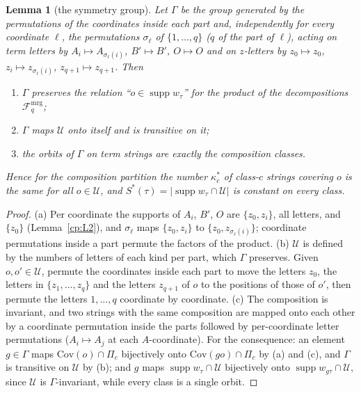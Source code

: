 \documentclass[11pt]{article}
\newtheorem{lemma}[theorem]{Lemma}
\theoremstyle{definition}
\theoremstyle{remark}
\newcommand{\abs}[1]{\lvert #1\rvert}
\DeclareMathOperator{\supp}{supp}
\newcommand{\Cov}{\mathrm{Cov}}               %
\newcommand{\Ukept}{\mathcal{U}}              %
\newcommand{\Fmrg}{\mathcal{F}^{\mathrm{mrg}}_q} %
\newcommand{\Bp}{B'}                          %
\newcommand{\Oterm}{O}                        %
\begin{document}
\begin{lemma}[the symmetry group]\label{cp:L6:lemmaC}
Let $\Gamma$ be the group generated by the permutations of the coordinates inside each part and, independently for every coordinate $\ell$, the permutations $\sigma_\ell$ of $\{1,\dots,q\}$ ($q$ of the part of $\ell$), acting on term letters by $A_i\mapsto A_{\sigma_\ell(i)}$, $\Bp\mapsto\Bp$, $\Oterm\mapsto\Oterm$ and on $z$-letters by $z_0\mapsto z_0$, $z_i\mapsto z_{\sigma_\ell(i)}$, $z_{q+1}\mapsto z_{q+1}$. Then
\begin{enumerate}[label=(\alph*)]
\item $\Gamma$ preserves the relation ``$o\in\supp w_\tau$'' for the product of the decompositions $\Fmrg$;
\item $\Gamma$ maps $\Ukept$ onto itself and is transitive on it;
\item the orbits of $\Gamma$ on term strings are exactly the composition classes.
\end{enumerate}
Hence for the composition partition the number $\kappa^*_c$ of class-$c$ strings covering $o$ is the same for all $o\in\Ukept$, and $S^*(\tau)=\abs{\supp w_\tau\cap\Ukept}$ is constant on every class.
\end{lemma}

\begin{proof}
(a) Per coordinate the supports of $A_i$, $\Bp$, $\Oterm$ are $\{z_0,z_i\}$, all letters, and $\{z_0\}$ (Lemma~\ref{cp:L2}), and $\sigma_\ell$ maps $\{z_0,z_i\}$ to $\{z_0,z_{\sigma_\ell(i)}\}$; coordinate permutations inside a part permute the factors of the product. (b) $\Ukept$ is defined by the numbers of letters of each kind per part, which $\Gamma$ preserves. Given $o,o'\in\Ukept$, permute the coordinates inside each part to move the letters $z_0$, the letters in $\{z_1,\dots,z_q\}$ and the letters $z_{q+1}$ of $o$ to the positions of those of $o'$, then permute the letters $1,\dots,q$ coordinate by coordinate. (c) The composition is invariant, and two strings with the same composition are mapped onto each other by a coordinate permutation inside the parts followed by per-coordinate letter permutations ($A_i\mapsto A_j$ at each $A$-coordinate).
For the consequence: an element $g\in\Gamma$ maps $\Cov(o)\cap\Pi_c$ bijectively onto $\Cov(go)\cap\Pi_c$ by (a) and (c), and $\Gamma$ is transitive on $\Ukept$ by (b); and $g$ maps $\supp w_\tau\cap\Ukept$ bijectively onto $\supp w_{g\tau}\cap\Ukept$, since $\Ukept$ is $\Gamma$-invariant, while every class is a single orbit.
\end{proof}
\end{document}
